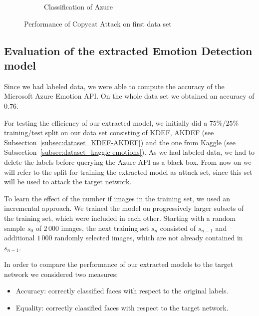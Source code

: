 \documentclass[a4paper,11pt]{article}
\begin{document}
\begin{figure}[h!]
\begin{subfigure}[c]{0.45\textwidth}
                \caption{Classification of Azure}
                \label{subfig:emotions_azure-labels}
            \end{subfigure}
            \caption{Performance of Copycat Attack on first data set}
            \label{fig:emotions_distribution-labels}
        \end{figure}
        

    \subsection{Evaluation of the extracted Emotion Detection model}
        Since we had labeled data, we were able to compute the accuracy of the Microsoft Azure Emotion API. On the whole data set we obtained an accuracy of $0.76$.
        
        For testing the efficiency of our extracted model, we initially did a $75\%/25\%$ training/test split on our data set consisting of KDEF, AKDEF (see Subsection~\ref{subsec:dataset_KDEF-AKDEF}) and the one from Kaggle (see Subsection~\ref{subsec:dataset_kaggle-emotions}). As we had labeled data, we had to delete the labels before querying the Azure API as a black-box. From now on we will refer to the split for training the extracted model as attack set, since this set will be used to attack the target network.
        
        To learn the effect of the number if images in the training set, we used an incremental approach. We trained the model on progressively larger subsets of the training set, which were included in each other. Starting with a random sample $s_0$ of $2\,000$ images, the next training set $s_n$ consisted of $s_{n-1}$ and additional $1\,000$ randomly selected images, which are not already contained in $s_{n-1}$.
        
        In order to compare the performance of our extracted models to the target network we considered two measures:
        \begin{itemize}
            \item Accuracy: correctly classified faces with respect to the original labels.
            \item Equality: correctly classified faces with respect to the target network.  
        \end{itemize}
        
\end{document}
